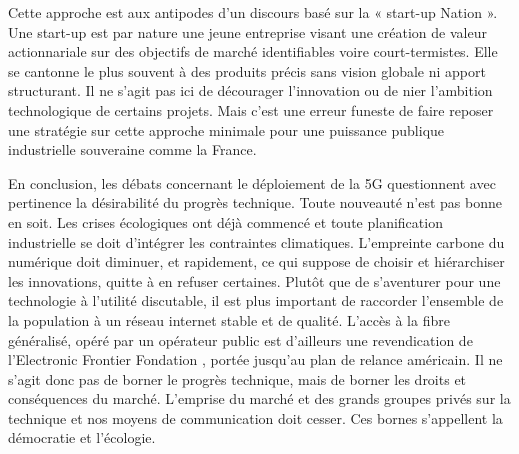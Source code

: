 \documentclass[a4paper]{article}
\begin{document}
Cette approche est aux antipodes d’un discours basé sur la « start-up Nation ». Une start-up est par nature une jeune entreprise visant une création de valeur actionnariale sur des objectifs de marché identifiables voire court-termistes. Elle se cantonne le plus souvent à des produits précis sans vision globale ni apport structurant. Il ne s'agit pas ici de décourager l'innovation ou de nier l’ambition technologique de certains projets. Mais c’est une erreur funeste de faire reposer une stratégie sur cette approche minimale pour une puissance publique industrielle souveraine comme la France.

En conclusion, les débats concernant le déploiement de la 5G questionnent avec pertinence la désirabilité du progrès technique. Toute nouveauté n’est pas bonne en soit. Les crises écologiques ont déjà commencé et toute planification industrielle se doit d’intégrer les contraintes climatiques. L’empreinte carbone du numérique doit diminuer, et rapidement,  ce qui suppose de choisir et hiérarchiser les innovations, quitte à en refuser certaines. Plutôt que de s’aventurer pour une technologie à l’utilité discutable, il est plus important de raccorder l’ensemble de la population à un réseau internet stable et de qualité. L’accès à la fibre généralisé, opéré par un opérateur public est d’ailleurs une revendication de l’Electronic Frontier Fondation , portée jusqu’au plan de relance américain. Il ne s’agit donc pas de borner le progrès technique, mais de borner les droits et conséquences du marché. L’emprise du marché et des grands groupes privés sur la technique et nos moyens de communication doit cesser. Ces bornes s’appellent la démocratie et l’écologie.



\end{document}
